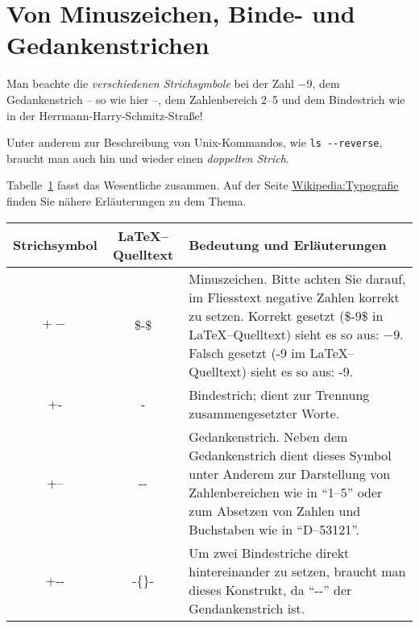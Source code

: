 \documentclass[14pt, a4paper]{scrartcl}
\begin{document}
%
\section*{Von Minuszeichen, Binde- und Gedankenstrichen}
Man beachte die \emph{verschiedenen Strichsymbole} bei der Zahl $-9$, dem Gedankenstrich -- so wie hier --, dem Zahlenbereich 2--5 und dem Bindestrich wie in der Herrmann-Harry-Schmitz-Straße!

Unter anderem zur Beschreibung von Unix-Kommandos, wie \texttt{ls -{}-reverse}, braucht man auch hin und wieder einen \emph{doppelten Strich}.

Tabelle~\ref{tab:strichsymbole} fasst das Wesentliche zusammen. Auf der Seite
\href{https://de.wikipedia.org/wiki/Wikipedia:Typografie#Bindestrich.2C_Gedankenstrich.2C_Minuszeichen_und_andere_waagerechte_Striche}{Wikipedia:Typografie} finden Sie nähere Erläuterungen zu dem Thema.
%
\begin{table}[h]
  \centering
  \label{tab:strichsymbole}
  \begin{tabularx}{\textwidth}{ccX}
    \toprule
	Strichsymbol & \LaTeX--Quelltext & Bedeutung und Erläuterungen \\
	\midrule
	$+-$ & \$-\$ & Minuszeichen. Bitte achten Sie darauf, im
	Fliesstext negative Zahlen korrekt zu setzen. Korrekt gesetzt (\$-9\$ in \LaTeX--Quelltext) sieht es so aus: $-9$. Falsch gesetzt (-9 im \LaTeX--Quelltext) sieht es so aus: -9.\\
	+- & - & Bindestrich; dient zur Trennung zusammengesetzter Worte. \\
	+-- & -{}- & Gedankenstrich. Neben dem Gedankenstrich dient dieses Symbol unter Anderem zur Darstellung von Zahlenbereichen wie in \enquote{1--5} oder zum Absetzen
	von Zahlen und Buchstaben wie in \enquote{D--53121}. \\
    +-{}- & -\{\}- & Um zwei Bindestriche direkt hintereinander zu setzen, braucht man dieses Konstrukt, da \enquote{-{}-} der Gendankenstrich ist. \\
	\bottomrule
  \end{tabularx}
\end{table}
\end{document}
